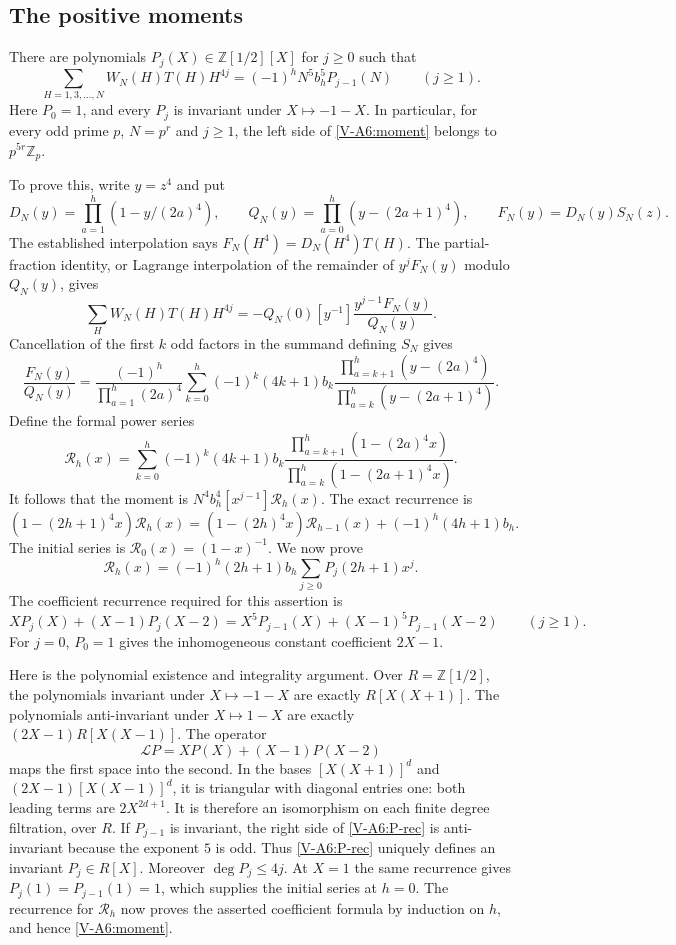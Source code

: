 \documentclass[11pt,letterpaper]{article}
\numberwithin{equation}{section}
\begin{document}
\subsection{The positive moments}
There are polynomials $P_j(X)\in\mathbb Z[1/2][X]$ for $j\ge0$ such that
\begin{equation}\label{V-A6:moment}
\sum_{H=1,3,\ldots,N}W_N(H)T(H)H^{4j}
=(-1)^hN^5b_h^5P_{j-1}(N)\qquad(j\ge1).
\end{equation}
Here $P_0=1$, and every $P_j$ is invariant under $X\mapsto-1-X$.
In particular, for every odd prime $p$, $N=p^r$ and $j\ge1$, the
left side of \eqref{V-A6:moment} belongs to $p^{5r}\mathbb Z_p$.

To prove this, write $y=z^4$ and put
\[
D_N(y)=\prod_{a=1}^h(1-y/(2a)^4),\qquad
Q_N(y)=\prod_{a=0}^h(y-(2a+1)^4),\qquad
F_N(y)=D_N(y)S_N(z).
\]
The established interpolation says $F_N(H^4)=D_N(H^4)T(H)$.
The partial-fraction identity, or Lagrange interpolation of the
remainder of $y^jF_N(y)$ modulo $Q_N(y)$, gives
\[
\sum_H W_N(H)T(H)H^{4j}
=-Q_N(0)[y^{-1}]\frac{y^{j-1}F_N(y)}{Q_N(y)}.
\]
Cancellation of the first $k$ odd factors in the summand defining
$S_N$ gives
\[
\frac{F_N(y)}{Q_N(y)}
=\frac{(-1)^h}{\prod_{a=1}^h(2a)^4}
\sum_{k=0}^h(-1)^k(4k+1)b_k
\frac{\prod_{a=k+1}^h(y-(2a)^4)}
{\prod_{a=k}^h(y-(2a+1)^4)}.
\]
Define the formal power series
\[
\mathcal R_h(x)=\sum_{k=0}^h(-1)^k(4k+1)b_k
\frac{\prod_{a=k+1}^h(1-(2a)^4x)}
{\prod_{a=k}^h(1-(2a+1)^4x)}.
\]
It follows that the moment is $N^4b_h^4[x^{j-1}]\mathcal R_h(x)$.
The exact recurrence is
\[
(1-(2h+1)^4x)\mathcal R_h(x)
=(1-(2h)^4x)\mathcal R_{h-1}(x)+(-1)^h(4h+1)b_h.
\]
The initial series is $\mathcal R_0(x)=(1-x)^{-1}$.
We now prove
\[
\mathcal R_h(x)=(-1)^h(2h+1)b_h
\sum_{j\ge0}P_j(2h+1)x^j.
\]
The coefficient recurrence required for this assertion is
\begin{equation}\label{V-A6:P-rec}
X P_j(X)+(X-1)P_j(X-2)
=X^5P_{j-1}(X)+(X-1)^5P_{j-1}(X-2)\qquad(j\ge1).
\end{equation}
For $j=0$, $P_0=1$ gives the inhomogeneous constant coefficient
$2X-1$.

Here is the polynomial existence and integrality argument.
Over $R=\mathbb Z[1/2]$, the polynomials invariant under
$X\mapsto-1-X$ are exactly $R[X(X+1)]$. The polynomials
anti-invariant under $X\mapsto1-X$ are exactly
$(2X-1)R[X(X-1)]$. The operator
\[
\mathcal L P=XP(X)+(X-1)P(X-2)
\]
maps the first space into the second. In the bases
$[X(X+1)]^d$ and $(2X-1)[X(X-1)]^d$, it is triangular with
diagonal entries one: both leading terms are $2X^{2d+1}$.
It is therefore an isomorphism on each finite degree filtration,
over $R$. If $P_{j-1}$ is invariant, the right side of
\eqref{V-A6:P-rec} is anti-invariant because the exponent $5$ is odd.
Thus \eqref{V-A6:P-rec} uniquely defines an invariant $P_j\in R[X]$.
Moreover $\deg P_j\le4j$. At $X=1$ the same recurrence gives
$P_j(1)=P_{j-1}(1)=1$, which supplies the initial series at $h=0$.
The recurrence for $\mathcal R_h$ now proves the asserted coefficient
formula by induction on $h$, and hence \eqref{V-A6:moment}.
\end{document}
